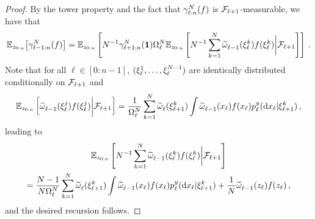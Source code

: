 \begin{proof} 
    By the tower property and the fact that $\gamma^N _{\ell:n}(f)$ is $\mathcal{F}_{\ell+1}$-measurable, we have that 
    \begin{equation*} 
        \mathbb{E}_{z_{0:n}} \big[ \gamma^N _{\ell-1:n}(f) \big] = \mathbb{E}_{z_{0:n}} \left[ N^{-1} \gamma^N _{\ell+1:n}(\mathbf{1}) \Omega^N _{\ell} \mathbb{E}_{z_{0:n}} \left[ N^{-1} \sum_{k = 1}^N \widetilde{\omega}^{} _{\ell-1}(\xi^{k} _{\ell}) f(\xi^{k} _{\ell})\bigg| \mathcal{F}_{\ell+1} \right]\right] \,.
    \end{equation*}
    Note that for all $\ell \in [0:n-1]$, $(\xi^{1} _{\ell}, \dotsc, \xi^{N-1} _\ell)$ are identically distributed conditionally on $\mathcal{F}_{\ell+1}$ and 
    \[ 
    \pE_{z_{0:n}} \left[\uweight{}{\ell-1}(\particle^{j} _{\ell}) f(\particle^{j} _{\ell}) \bigg| \filtration{\ell+1} \right] = \frac{1}{\sumweight{\ell}} \sum_{k = 1}^N \uweight{}{\ell}(\particle^{k} _{\ell+1}) \int \uweight{}{\ell-1}(x_\ell) f(x_{\ell }) \bwopt{\ell}{y}{\particle^{k} _{\ell+1}}{\rmd x_{\ell}} \eqsp,
    \]
    leading to 
    \begin{multline*} 
        \pE_{z_{0:n}} \left[ N^{-1} \sum_{k = 1}^N \uweight{}{\ell-1}(\particle^{k} _{\ell}) f(\particle^{k} _{\ell}) \bigg| \filtration{\ell+1} \right] \\
        = \frac{N-1}{N \sumweight{\ell}} \sum_{k = 1}^N \uweight{}{\ell}(\particle^{k} _{\ell+1}) \int \uweight{}{\ell-1}(x_\ell) f(x_{\ell }) \bwopt{\ell}{y}{\particle^{k} _{\ell+1}}{\rmd x_{\ell}} + \frac{1}{N} \uweight{}{\ell-1}(z_\ell) f(z_{\ell}) \eqsp,
    \end{multline*}
    and the desired recursion follows.
\end{proof}

